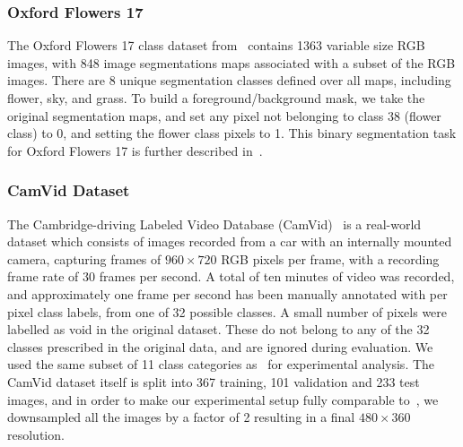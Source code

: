 
\subsubsection{Oxford Flowers 17}
The Oxford Flowers 17 class dataset from~\cite{Nilsback06} contains 1363
variable size RGB images, with 848 image segmentations maps associated with
a subset of
the RGB images. There are 8 unique segmentation classes defined over all maps,
including flower, sky, and grass. To build a foreground/background mask,
we take the original segmentation maps, and set any pixel not belonging to
class 38 (flower class) to 0, and setting the flower class pixels to 1.
This binary segmentation task for Oxford Flowers 17 is further described
in~\cite{Xiaomeng14}.

\subsubsection{CamVid Dataset}
The Cambridge-driving Labeled Video Database
(CamVid)~\cite{Brostow2010semantic} is a real-world dataset which consists of
images recorded from a car with an internally mounted camera, capturing frames
of $960 \times 720$ RGB pixels per frame, with a recording frame rate of 30
frames per second. A total of ten minutes of video was recorded, and
approximately one frame per second has been manually annotated with per pixel
class labels, from one of 32 possible classes.  A small number of pixels were
labelled as void in the original dataset. These do not belong to any of the 32
classes prescribed in the original data, and are ignored during evaluation.  We
used the same subset of 11 class categories as~\cite{badrinarayanan2015segnet}
for experimental analysis.  The CamVid dataset itself is split into 367
training, 101 validation and 233 test images, and in order to make our
experimental setup fully comparable to~\cite{badrinarayanan2015segnet}, we
downsampled all the images by a factor of 2 resulting in a final $480 \times
360$ resolution.

